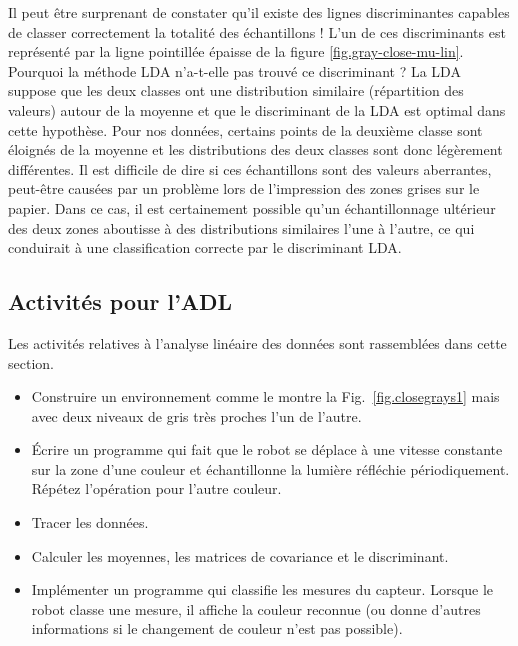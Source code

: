 Il peut être surprenant de constater qu'il existe des lignes discriminantes capables de classer correctement la totalité des échantillons ! L'un de ces discriminants est représenté par la ligne pointillée épaisse de la figure \ref{fig.gray-close-mu-lin}. Pourquoi la méthode LDA n'a-t-elle pas trouvé ce discriminant ? La LDA suppose que les deux classes ont une distribution similaire (répartition des valeurs) autour de la moyenne et que le discriminant de la LDA est optimal dans cette hypothèse. Pour nos données, certains points de la deuxième classe sont éloignés de la moyenne et les distributions des deux classes sont donc légèrement différentes. Il est difficile de dire si ces échantillons sont des valeurs aberrantes, peut-être causées par un problème lors de l'impression des zones grises sur le papier. Dans ce cas, il est certainement possible qu'un échantillonnage ultérieur des deux zones aboutisse à des distributions similaires l'une à l'autre, ce qui conduirait à une classification correcte par le discriminant LDA.

\subsection{Activités pour l'ADL}

Les activités relatives à l'analyse linéaire des données sont rassemblées dans cette section.

\begin{framed}
\begin{itemize}
\item Construire un environnement comme le montre la Fig.~\ref{fig.closegrays1} mais avec deux niveaux de gris très proches l'un de l'autre.
\item Écrire un programme qui fait que le robot se déplace à une vitesse constante sur la zone d'une couleur et échantillonne la lumière réfléchie périodiquement. Répétez l'opération pour l'autre couleur.
\item Tracer les données.
\item Calculer les moyennes, les matrices de covariance et le discriminant. 
\item Implémenter un programme qui classifie les mesures du capteur. Lorsque le robot classe une mesure, il affiche la couleur reconnue (ou donne d'autres informations si le changement de couleur n'est pas possible).
\end{itemize}
\end{framed}

